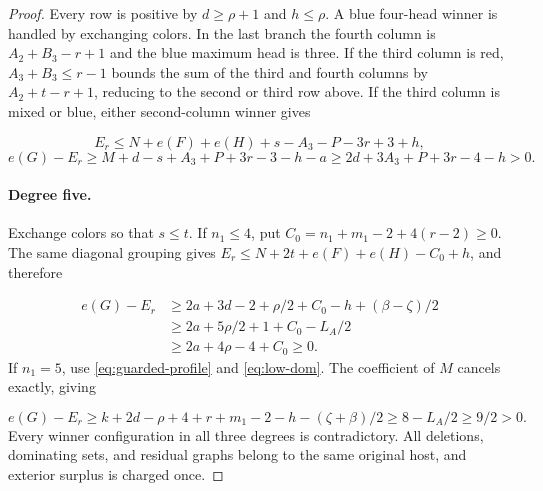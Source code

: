 \documentclass[11pt,a4paper]{article}
\theoremstyle{definition}
\begin{document}
\begin{proof}
Every row is positive by $d\ge\rho+1$ and $h\le\rho$.
A blue four-head winner is handled by exchanging colors.
In the last branch the fourth column is $A_2+B_3-r+1$ and the blue maximum head is three.
If the third column is red, $A_3+B_3\le r-1$ bounds the sum of the third and fourth columns by $A_2+t-r+1$, reducing to the second or third row above.
If the third column is mixed or blue, either second-column winner gives

\[
E_r\le N+e(F)+e(H)+s-A_3-P-3r+3+h,
\]
\[
e(G)-E_r\ge M+d-s+A_3+P+3r-3-h-a
\ge2d+3A_3+P+3r-4-h>0.
\]
\paragraph{Degree five.}
Exchange colors so that $s\le t$.
If $n_1\le4$, put $C_0=n_1+m_1-2+4(r-2)\ge0$.
The same diagonal grouping gives
$E_r\le N+2t+e(F)+e(H)-C_0+h$, and therefore

\[
\begin{aligned}
e(G)-E_r
&\ge2a+3d-2+\rho/2+C_0-h+(\beta-\zeta)/2\\
&\ge2a+5\rho/2+1+C_0-L_A/2\\
&\ge2a+4\rho-4+C_0\ge0.
\end{aligned}
\]
If $n_1=5$, use \eqref{eq:guarded-profile} and \eqref{eq:low-dom}.
The coefficient of $M$ cancels exactly, giving

\[
e(G)-E_r
\ge k+2d-\rho+4+r+m_1-2-h-(\zeta+\beta)/2
\ge8-L_A/2\ge9/2>0.
\]
Every winner configuration in all three degrees is contradictory.
All deletions, dominating sets, and residual graphs belong to the same original host, and exterior surplus is charged once.
\end{proof}
\end{document}
